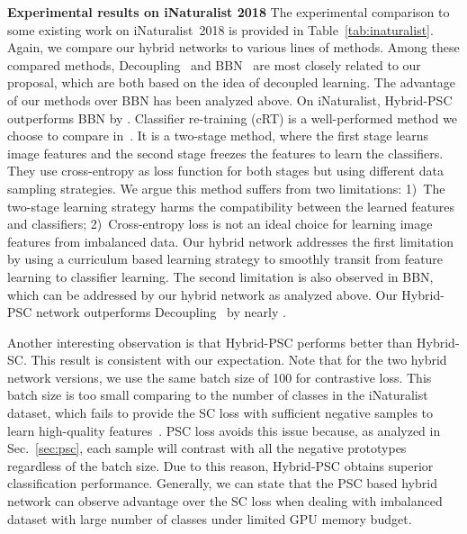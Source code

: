 \documentclass[final]{cvpr}
\begin{document}
\par{\textbf{Experimental results on iNaturalist 2018}} The experimental comparison to some existing work on iNaturalist~2018 is provided in Table~\ref{tab:inaturalist}. Again, we compare our hybrid networks to various lines of methods. Among these compared methods, Decoupling~\cite{Decoupling} and BBN~\cite{BBN} are most closely related to our proposal, which are both based on the idea of decoupled learning. The advantage of our methods over BBN has been analyzed above. On iNaturalist, Hybrid-PSC outperforms BBN by . 
Classifier re-training (cRT) is a well-performed method we choose to compare in~\cite{Decoupling}. It is a two-stage method, where the first stage learns image features and the second stage freezes the features to learn the classifiers. They use cross-entropy as loss function for both stages but using different data sampling strategies. We argue this method suffers from two limitations: 1)~The two-stage learning strategy harms the compatibility between the learned features and classifiers; 2)~Cross-entropy loss is not an ideal choice for learning image features from imbalanced data.
Our hybrid network addresses the first limitation by using a curriculum based learning strategy to smoothly transit from feature learning to classifier learning. The second limitation is also observed in BBN, which can be addressed by our hybrid network as analyzed above. Our Hybrid-PSC network outperforms Decoupling~\cite{Decoupling}
by nearly .  

Another interesting observation is that Hybrid-PSC performs better than Hybrid-SC. This result is consistent with our expectation. Note that for the two hybrid network versions, we use the same batch size of 100 for contrastive loss. This batch size is too small comparing to the number of classes in the iNaturalist dataset, which fails to provide the SC loss with sufficient negative samples to learn high-quality features~\cite{simclr}. 
PSC loss avoids this issue because, as analyzed in Sec.~\ref{sec:psc}, each sample will contrast with all the negative prototypes regardless of the batch size.  
Due to this reason, Hybrid-PSC obtains superior classification performance. Generally, we can state that the PSC based hybrid network can observe advantage over the SC loss when dealing with imbalanced dataset with large number of classes under limited GPU memory budget. 
\end{document}
